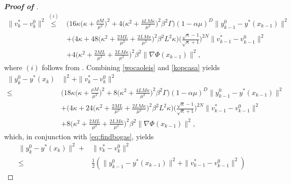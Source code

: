 \documentclass{osudissert96}
\begin{document}
\begin{proof}[\bf Proof of ]
\begin{align}\label{kopcasa}
\|v_k^*-v_k^0\|^2\overset{(i)}\leq&\Big(16 \kappa \Big(\kappa +\frac{\rho M}{\mu^2} \Big)^2+4\Big(\kappa^2+\frac{4LM\kappa}{\mu^2}\Big)^2\beta^2\Gamma \Big)(1-\alpha\mu)^D\|y_{k-1}^0-y^*(x_{k-1})\|^2 \nonumber
\\&+\Big(4\kappa+48\Big(\kappa^2+\frac{2ML}{\mu^2}+\frac{2LM\kappa}{\mu^2}\Big)^2\beta^2L^2 \kappa \Big) \Big( \frac{\sqrt{\kappa}-1}{\sqrt{\kappa}+1} \Big)^{2N}\|v_{k-1}^*-v_{k-1}^0\|^2 \nonumber
\\&+ 4\Big(\kappa^2+\frac{2ML}{\mu^2}+\frac{2LM\kappa}{\mu^2}\Big)^2\beta^2\|\nabla \Phi(x_{k-1})\|^2, 
\end{align}
where $(i)$ follows from . Combining \cref{wocaoleis} and  \cref{kopcasa} yields
\begin{align*}
\|y^0_k-y^*(x_k)&\|^2 + \|v_k^*-v_k^0\|^2  \nonumber
\\\leq &\Big(18 \kappa \Big(\kappa +\frac{\rho M}{\mu^2} \Big)^2+8\Big(\kappa^2+\frac{4LM\kappa}{\mu^2}\Big)^2\beta^2\Gamma \Big)(1-\alpha\mu)^D\|y_{k-1}^0-y^*(x_{k-1})\|^2 \nonumber
\\&+\Big(4\kappa+24\Big(\kappa^2+\frac{2ML}{\mu^2}+\frac{2LM\kappa}{\mu^2}\Big)^2\beta^2L^2 \kappa \Big) \Big( \frac{\sqrt{\kappa}-1}{\sqrt{\kappa}+1} \Big)^{2N}\|v_{k-1}^*-v_{k-1}^0\|^2 \nonumber
\\&+ 8\Big(\kappa^2+\frac{2ML}{\mu^2}+\frac{2LM\kappa}{\mu^2}\Big)^2\beta^2\|\nabla \Phi(x_{k-1})\|^2,
\end{align*}
which, in conjunction with \cref{eq:findbogas},   yields
\begin{align}\label{eq:televk00}
\|y^0_k-y^*(x_k)\|^2 +& \|v_k^*-v_k^0\|^2 \nonumber
\\\leq &\frac{1}{2} (\|y^0_{k-1}-y^*(x_{k-1})\|^2 + \|v_{k-1}^*-v_{k-1}^0\|^2) \nonumber

\end{align}
\end{proof}
\end{document}

